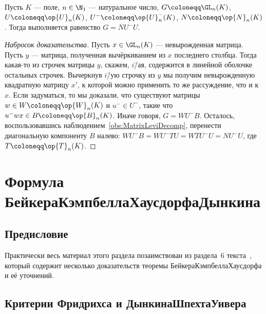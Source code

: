 \documentclass[
	extrafontsizes,
	11pt,
	hyphens,
]{memoir}
\begin{document}
\begin{theorem}
Пусть \(K\) --- поле, \(n \in \N_1\) --- натуральное число,
\(G \coloneqq \GL_n(K)\), \(U \coloneqq \op{U}_n(K)\), \(U^{-} \coloneqq \op{U}^{-}_n(K)\), \(N \coloneqq \op{N}_n(K)\).
Тогда выполняется равенство \(G = N U^{-} U\).
\end{theorem}

\begin{proof}[Набросок доказательства]
Пусть \(x \in \GL_n(K)\) --- невырожденная матрица.
Пусть \(y\) --- матрица, полученная вычёркиванием из \(x\) последнего столбца.
Тогда какая-то из строчек матрицы \(y\), скажем, \(i\)\=/ая, содержится в линейной оболочке остальных строчек.
Вычеркнув \(i\)\=/ую строчку из \(y\) мы получим невырожденную квадратную матрицу \(x'\), к которой можно применить то же рассуждение, что и к \(x\).
Если задуматься, то мы доказали, что существуют матрицы \(w \in W \coloneqq \op{W}_n(K)\) и \(u^{-} \in U^{-}\), такие что \(u^{-} w x \in B \coloneqq \op{B}_n(K)\).
Иначе говоря, \(G = W U^{-} B\).
Осталось, воспользовавшись наблюдением~\ref{obs:MatrixLeviDecomp}, перенести диагональную компоненту \(B\) налево:
\(W U^{-} B = W U^{-} T U = W T U^{-} U = N U^{-} U\), где \(T \coloneqq \op{T}_n(K)\).
\end{proof}


\section{Формула Бейкера\namedash{}Кэмпбелла\namedash{}Хаусдорфа\namedash{}Дынкина}
\label{sec:BKHD}

\subsection{Предисловие}

Практически весь материал этого раздела позаимствован из раздела~6 текста~\cite{Mueger_BCHD}, который содержит несколько доказательств теоремы Бейкера\namedash{}Кэмпбелла\namedash{}Хаусдорфа и её уточнений.

\subsection{Критерии Фридрихса и Дынкина\namedash{}Шпехта\namedash{}Уивера}

\end{document}
